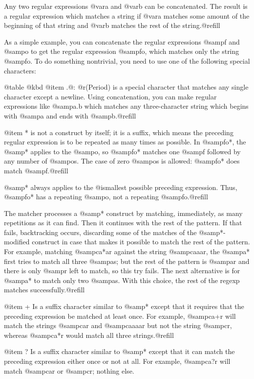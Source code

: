 {{{{{{Any two regular expressions @var{a} and @var{b} can be concatenated.  The
result is a regular expression which matches a string if @var{a} matches
some amount of the beginning of that string and @var{b} matches the rest of
the string.@refill

As a simple example, you can concatenate the regular expressions @samp{f}
and @samp{o} to get the regular expression @samp{fo}, which matches only
the string @samp{fo}.  To do something nontrivial, you
need to use one of the following special characters:

@table @kbd
@item .@: @r{(Period)}
is a special character that matches any single character except a newline.
Using concatenation, you can make regular expressions like @samp{a.b} which
matches any three-character string which begins with @samp{a} and ends with
@samp{b}.@refill

@item *
is not a construct by itself; it is a suffix, which means the
preceding regular expression is to be repeated as many times as
possible.  In @samp{fo*}, the @samp{*} applies to the @samp{o}, so
@samp{fo*} matches one @samp{f} followed by any number of @samp{o}s.
The case of zero @samp{o}s is allowed: @samp{fo*} does match
@samp{f}.@refill

@samp{*} always applies to the @i{smallest} possible preceding
expression.  Thus, @samp{fo*} has a repeating @samp{o}, not a
repeating @samp{fo}.@refill

The matcher processes a @samp{*} construct by matching, immediately,
as many repetitions as it can find.  Then it continues with the rest
of the pattern.  If that fails, backtracking occurs, discarding some
of the matches of the @samp{*}-modified construct in case that makes
it possible to match the rest of the pattern.  For example, matching
@samp{ca*ar} against the string @samp{caaar}, the @samp{a*} first
tries to match all three @samp{a}s; but the rest of the pattern is
@samp{ar} and there is only @samp{r} left to match, so this try fails.
The next alternative is for @samp{a*} to match only two @samp{a}s.
With this choice, the rest of the regexp matches successfully.@refill

@item +
Is a suffix character similar to @samp{*} except that it requires that
the preceding expression be matched at least once.  For example,
@samp{ca+r} will match the strings @samp{car} and @samp{caaaar}
but not the string @samp{cr}, whereas @samp{ca*r} would match all
three strings.@refill

@item ?
Is a suffix character similar to @samp{*} except that it can match the
preceding expression either once or not at all.  For example,
@samp{ca?r} will match @samp{car} or @samp{cr}; nothing else.

}}}}}}
